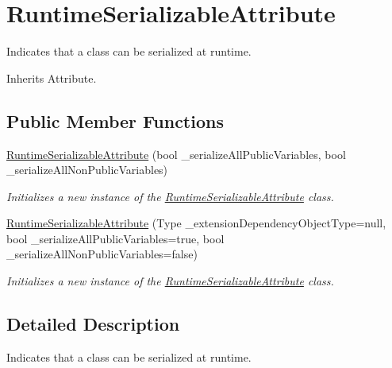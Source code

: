 \hypertarget{class_voxel_busters_1_1_runtime_serialization_1_1_runtime_serializable_attribute}{}\section{Runtime\+Serializable\+Attribute}
\label{class_voxel_busters_1_1_runtime_serialization_1_1_runtime_serializable_attribute}


Indicates that a class can be serialized at runtime.  




Inherits Attribute.

\subsection*{Public Member Functions}
\begin{DoxyCompactItemize}
\item 
\hyperlink{class_voxel_busters_1_1_runtime_serialization_1_1_runtime_serializable_attribute_a2905def45da7c64fc82be1b7d8a06953}{Runtime\+Serializable\+Attribute} (bool \+\_\+serialize\+All\+Public\+Variables, bool \+\_\+serialize\+All\+Non\+Public\+Variables)
\begin{DoxyCompactList}\small\item\em Initializes a new instance of the \hyperlink{class_voxel_busters_1_1_runtime_serialization_1_1_runtime_serializable_attribute}{Runtime\+Serializable\+Attribute} class. \end{DoxyCompactList}\item 
\hyperlink{class_voxel_busters_1_1_runtime_serialization_1_1_runtime_serializable_attribute_ae55096cbc6b4da9974bf052598d4eb8f}{Runtime\+Serializable\+Attribute} (Type \+\_\+extension\+Dependency\+Object\+Type=null, bool \+\_\+serialize\+All\+Public\+Variables=true, bool \+\_\+serialize\+All\+Non\+Public\+Variables=false)
\begin{DoxyCompactList}\small\item\em Initializes a new instance of the \hyperlink{class_voxel_busters_1_1_runtime_serialization_1_1_runtime_serializable_attribute}{Runtime\+Serializable\+Attribute} class. \end{DoxyCompactList}\end{DoxyCompactItemize}


\subsection{Detailed Description}
Indicates that a class can be serialized at runtime. 



